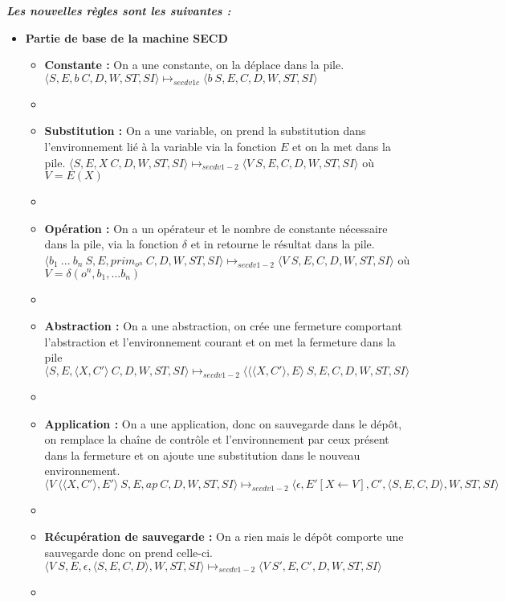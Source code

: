 \documentclass[10pt,a4paper]{report}
\begin{document}
\textbf{\textit{Les nouvelles règles sont les suivantes :}}
\smallbreak
\begin{itemize}
\item[] \textbf{Partie de base de la machine SECD}
  \begin{itemize}
  \item[] \textbf{Constante :} On a une constante, on la déplace dans la pile. 
    \smallbreak
    $\langle S,E,b~C,D,W,ST,SI\rangle 
    \longmapsto_{secdv1c} 
    \langle b~S,E,C,D,W,ST,SI\rangle$
  \item[]
    
  \item[] \textbf{Substitution :} On a une variable, on prend la substitution dans l'environnement lié à la variable via la fonction $E$ et on la met dans la pile.  
    \smallbreak 
    $\langle S,E,X~C,D,W,ST,SI\rangle 
    \longmapsto_{secdv1-2} 
    \langle V~S,E,C,D,W,ST,SI\rangle$ 
    où $V = E(X)$
  \item[]
    
  \item[] \textbf{Opération :} On a un opérateur et le nombre de constante nécessaire dans la pile, via la fonction $\delta$ et in retourne le résultat dans la pile. 
    \smallbreak
    $\langle b_{1}~...~b_{n}~S,E,prim_{o^{n}}~C,D,W,ST,SI\rangle 
    \longmapsto_{secdv1-2} 
    \langle V~S,E,C,D,W,ST,SI\rangle$ 
    où $V = \delta(o^{n},b_1,...b_{n})$
  \item[]
    
  \item[] \textbf{Abstraction :} On a une abstraction, on crée une fermeture comportant l'abstraction et l'environnement courant et on met la fermeture dans la pile
    \smallbreak
    $\langle S,E,\langle X,C'\rangle~C,D,W,ST,SI\rangle 
    \longmapsto_{secdv1-2} 
    \langle\langle\langle X,C'\rangle,E\rangle~S,E,C,D,W,ST,SI\rangle$
  \item[]
    
  \item[] \textbf{Application :} On a une application, donc on sauvegarde dans le dépôt, on remplace la chaîne de contrôle et l'environnement par ceux présent dans la fermeture et on ajoute une substitution dans le nouveau environnement.
    \smallbreak
    $\langle V~\langle\langle X,C'\rangle,E'\rangle~S,E,ap~C,D,W,ST,SI\rangle 
    \longmapsto_{secdv1-2} 
    \langle\epsilon,E'[X \leftarrow V],C',\langle S,E,C,D\rangle,W,ST,SI\rangle$
  \item[]
    
  \item[] \textbf{Récupération de sauvegarde :} On a rien mais le dépôt comporte une sauvegarde donc on prend celle-ci.
    \smallbreak
    $\langle V~S,E,\epsilon,\langle S,E,C,D\rangle,W,ST,SI\rangle 
    \longmapsto_{secdv1-2} 
    \langle V~S',E,C',D,W,ST,SI\rangle$
  \item[]
    

\end{itemize}
\end{itemize}
\end{document}
